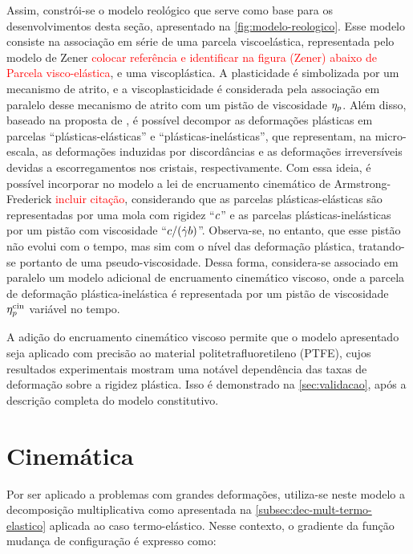 \documentclass[Tese.tex]{subfiles}
\begin{document}
Assim, constrói-se o modelo reológico que serve como base para os desenvolvimentos desta seção, apresentado na \autoref{fig:modelo-reologico}. Esse modelo consiste na associação em série de uma parcela viscoelástica, representada pelo modelo de Zener \textcolor{red}{colocar referência e identificar na figura (Zener) abaixo de Parcela visco-elástica}, e uma viscoplástica. A plasticidade é simbolizada por um mecanismo de atrito, e a viscoplasticidade é considerada pela associação em paralelo desse mecanismo de atrito com um pistão de viscosidade $\eta_{p}$. Além disso, baseado na proposta de , é possível decompor as deformações plásticas em parcelas ``plásticas-elásticas'' e ``plásticas-inelásticas'', que representam, na micro-escala, as deformações induzidas por discordâncias e as deformações irreversíveis devidas a escorregamentos nos cristais, respectivamente. Com essa ideia, é possível incorporar no modelo a lei de encruamento cinemático de Armstrong-Frederick \textcolor{red}{incluir citação}, considerando que as parcelas plásticas-elásticas são representadas por uma mola com rigidez ``$c$'' e as parcelas plásticas-inelásticas por um pistão com viscosidade ``$c/(\dot{\gamma}b)$''. Observa-se, no entanto, que esse pistão não evolui com o tempo, mas sim com o nível das deformação plástica, tratando-se portanto de uma pseudo-viscosidade. Dessa forma, considera-se associado em paralelo um modelo adicional de encruamento cinemático viscoso, onde a parcela de deformação plástica-inelástica é representada por um pistão de viscosidade $\eta_{p}^\text{cin}$ variável no tempo. 

A adição do encruamento cinemático viscoso permite que o modelo apresentado seja aplicado com precisão ao material politetrafluoretileno (PTFE), cujos resultados experimentais mostram uma notável dependência das taxas de deformação sobre a rigidez plástica. Isso é demonstrado na \autoref{sec:validacao}, após a descrição completa do modelo constitutivo.

\section{Cinemática}\label{sec:cinematica-vep}
Por ser aplicado a problemas com grandes deformações, utiliza-se neste modelo a decomposição multiplicativa como apresentada na \autoref{subsec:dec-mult-termo-elastico} aplicada ao caso termo-elástico. Nesse contexto, o gradiente da função mudança de configuração é expresso como:
\end{document}
